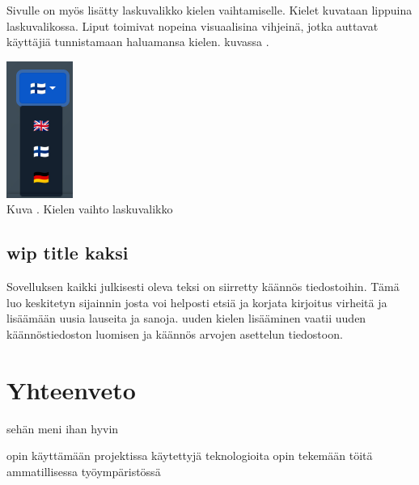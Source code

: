 \documentclass[11pt,a4paper,titlepage,oneside]{article}
\begin{document}
Sivulle on myös lisätty laskuvalikko kielen vaihtamiselle. 
Kielet kuvataan lippuina laskuvalikossa.
Liput toimivat nopeina visuaalisina vihjeinä, jotka auttavat käyttäjiä tunnistamaan haluamansa kielen.
kuvassa \nextImageCount.



\bigskip
\includegraphics[]{src/public/locale_laskuvalikko.png}\\
Kuva \getImgCount {}. Kielen vaihto laskuvalikko


\subsection{wip title kaksi}
Sovelluksen kaikki julkisesti oleva teksi on siirretty käännös tiedostoihin. 
Tämä luo keskitetyn sijainnin josta voi helposti etsiä ja korjata kirjoitus virheitä ja lisäämään uusia lauseita ja sanoja.
uuden kielen lisääminen vaatii uuden käännöstiedoston luomisen ja käännös arvojen asettelun tiedostoon.
\medskip











\newpage
{} %










\newpage
\section{Yhteenveto}             %

sehän meni ihan hyvin 

opin käyttämään projektissa käytettyjä teknologioita
opin tekemään töitä ammatillisessa työympäristössä
\medskip
\end{document}
